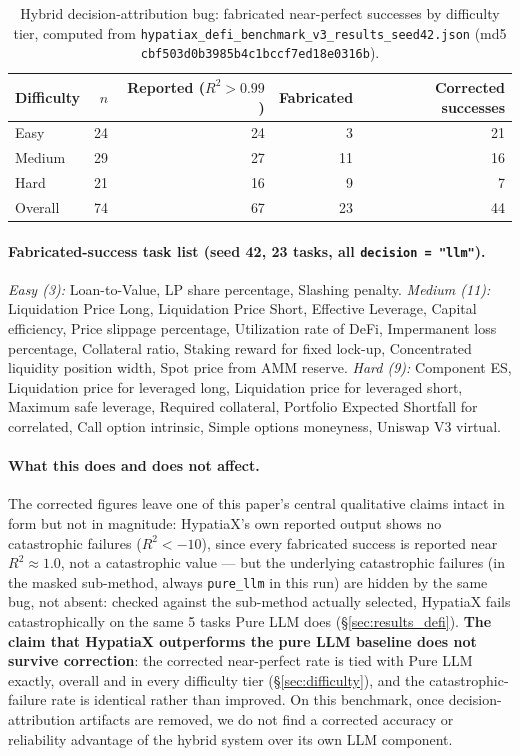 \documentclass[twoside,11pt]{article}
\newcommand{\Rsq}{R^{2}}
\begin{document}
\begin{table}[h]
\centering
\caption{Hybrid decision-attribution bug: fabricated near-perfect successes by
difficulty tier, computed from \texttt{hypatiax\_defi\_benchmark\_v3\_results\_seed42.json}
(md5 \texttt{cbf503d0b3985b4c1bccf7ed18e0316b}).}
\label{tab:hybrid-bug-breakdown}
\begin{tabular}{lrrrr}
\toprule
Difficulty & $n$ & Reported ($\Rsq>0.99$) & Fabricated & Corrected successes \\
\midrule
Easy    & 24 & 24 & 3  & 21 \\
Medium  & 29 & 27 & 11 & 16 \\
Hard    & 21 & 16 & 9  & 7 \\
\midrule
Overall & 74 & 67 & 23 & 44 \\
\bottomrule
\end{tabular}
\end{table}

\paragraph{Fabricated-success task list (seed 42, 23 tasks, all
\texttt{decision = "llm"}).} \emph{Easy (3):} Loan-to-Value, LP share
percentage, Slashing penalty.
\emph{Medium (11):} Liquidation Price Long, Liquidation Price Short,
Effective Leverage, Capital efficiency, Price slippage percentage,
Utilization rate of DeFi, Impermanent loss percentage, Collateral ratio,
Staking reward for fixed lock-up, Concentrated liquidity position width,
Spot price from AMM reserve.
\emph{Hard (9):} Component ES, Liquidation price for leveraged long,
Liquidation price for leveraged short, Maximum safe leverage, Required
collateral, Portfolio Expected Shortfall for correlated, Call option
intrinsic, Simple options moneyness, Uniswap V3 virtual.

\paragraph{What this does and does not affect.} The corrected figures leave
one of this paper's central qualitative claims intact in form but not in
magnitude: HypatiaX's own reported output shows no catastrophic failures
($\Rsq < -10$), since every fabricated success is reported near
$\Rsq \approx 1.0$, not a catastrophic value --- but the underlying
catastrophic failures (in the masked sub-method, always \texttt{pure\_llm}
in this run) are hidden by the same bug, not absent: checked against the
sub-method actually selected, HypatiaX fails catastrophically on the same
5 tasks Pure LLM does (\S\ref{sec:results_defi}). \textbf{The claim that
HypatiaX outperforms the pure LLM baseline does not survive correction}:
the corrected near-perfect rate is tied with Pure LLM exactly, overall
and in every difficulty tier (\S\ref{sec:difficulty}), and the
catastrophic-failure rate is identical rather than improved. On this
benchmark, once decision-attribution artifacts are removed, we do not
find a corrected accuracy or reliability advantage of the hybrid system
over its own LLM component.
\end{document}
